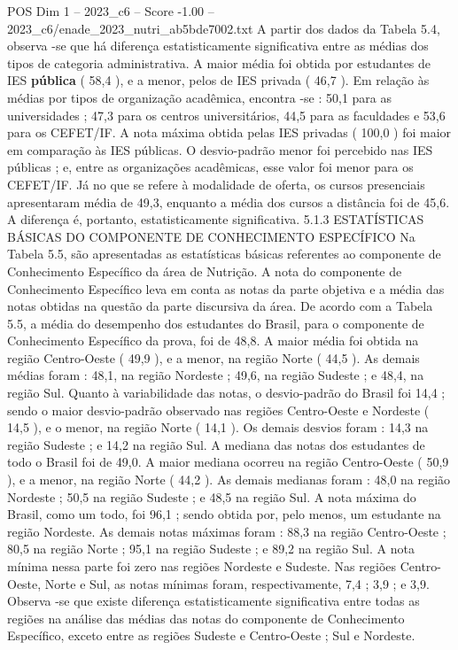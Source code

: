 \begin{textsample}{POS Dim 1 – 2023\_c6 – Score -1.00 – 2023\_c6/enade\_2023\_nutri\_ab5bde7002.txt}
A partir dos dados da Tabela 5.4, observa -se que há diferença estatisticamente significativa entre as médias dos tipos de categoria administrativa.
A maior média foi obtida por estudantes de IES \textbf{pública} ( 58,4 ), e a menor, pelos de IES privada ( 46,7 ).
Em relação às médias por tipos de organização acadêmica, encontra -se : 50,1 para as universidades ; 47,3 para os centros universitários, 44,5 para as faculdades e 53,6 para os CEFET/IF.
A nota máxima obtida pelas IES privadas ( 100,0 ) foi maior em comparação às IES públicas.
O desvio-padrão menor foi percebido nas IES públicas ; e, entre as organizações acadêmicas, esse valor foi menor para os CEFET/IF.
Já no que se refere à modalidade de oferta, os cursos presenciais apresentaram média de 49,3, enquanto a média dos cursos a distância foi de 45,6.
A diferença é, portanto, estatisticamente significativa. 5.1.3 ESTATÍSTICAS BÁSICAS DO COMPONENTE DE CONHECIMENTO ESPECÍFICO Na Tabela 5.5, são apresentadas as estatísticas básicas referentes ao componente de Conhecimento Específico da área de Nutrição.
A nota do componente de Conhecimento Específico leva em conta as notas da parte objetiva e a média das notas obtidas na questão da parte discursiva da área.
De acordo com a Tabela 5.5, a média do desempenho dos estudantes do Brasil, para o componente de Conhecimento Específico da prova, foi de 48,8.
A maior média foi obtida na região Centro-Oeste ( 49,9 ), e a menor, na região Norte ( 44,5 ).
As demais médias foram : 48,1, na região Nordeste ; 49,6, na região Sudeste ; e 48,4, na região Sul.
Quanto à variabilidade das notas, o desvio-padrão do Brasil foi 14,4 ; sendo o maior desvio-padrão observado nas regiões Centro-Oeste e Nordeste ( 14,5 ), e o menor, na região Norte ( 14,1 ).
Os demais desvios foram : 14,3 na região Sudeste ; e 14,2 na região Sul.
A mediana das notas dos estudantes de todo o Brasil foi de 49,0.
A maior mediana ocorreu na região Centro-Oeste ( 50,9 ), e a menor, na região Norte ( 44,2 ).
As demais medianas foram : 48,0 na região Nordeste ; 50,5 na região Sudeste ; e 48,5 na região Sul.
A nota máxima do Brasil, como um todo, foi 96,1 ; sendo obtida por, pelo menos, um estudante na região Nordeste.
As demais notas máximas foram : 88,3 na região Centro-Oeste ; 80,5 na região Norte ; 95,1 na região Sudeste ; e 89,2 na região Sul.
A nota mínima nessa parte foi zero nas regiões Nordeste e Sudeste.
Nas regiões Centro-Oeste, Norte e Sul, as notas mínimas foram, respectivamente, 7,4 ; 3,9 ; e 3,9.
Observa -se que existe diferença estatisticamente significativa entre todas as regiões na análise das médias das notas do componente de Conhecimento Específico, exceto entre as regiões Sudeste e Centro-Oeste ; Sul e Nordeste.

\end{textsample}
